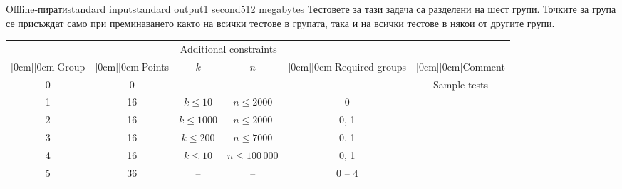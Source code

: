 \begin{problem}{Offline-пирати}{standard input}{standard output}{1 second}{512 megabytes}
\Scoring
Тестовете за тази задача са разделени на шест групи. Точките за група се присъждат само при преминаването както на всички тестове в групата, така и на всички тестове в някои от другите групи.


\medskip
\begin{center}
\begingroup
\renewcommand{\arraystretch}{1.5}
\begin{tabular}{|c|c|c|c|c|c|}
\hline
& & \multicolumn{2}{|c|}{Additional constraints} & & \\
\cline{3-4}
\raisebox{2.25ex}[0cm][0cm]{Group}
& \raisebox{2.25ex}[0cm][0cm]{Points}
& $k$ & $n$
& \raisebox{2.25ex}[0cm][0cm]{\parbox{3cm}{\centering Required groups}}
& \raisebox{2.25ex}[0cm][0cm]{Comment}
\\
\hline
0 & 0 & -- & -- & -- & Sample tests \\
\hline
1 & 16 & $k \le 10$ & $n \le 2000$ & 0 &  \\
\hline
2 & 16 & $k \le 1000$ & $n \le 2000$ & 0, 1 &  \\
\hline
3 & 16 & $k \le 200$ & $n \le 7000$ & 0, 1 &  \\
\hline
4 & 16 & $k \le 10$ & $n \le 100\,000$ & 0, 1 &  \\
\hline
5 & 36 & -- & -- & 0 -- 4 &  \\
\hline
\end{tabular}
\endgroup
\end{center}




\end{problem}

